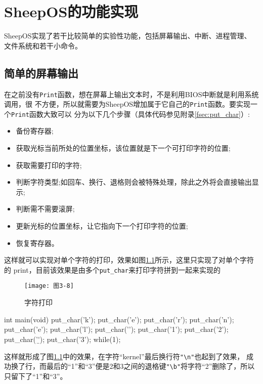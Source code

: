 \chapter{SheepOS的功能实现}

SheepOS实现了若干比较简单的实验性功能，包括屏幕输出、中断、进程管理、
文件系统和若干小命令。

\section{简单的屏幕输出}

在之前没有\texttt{Print}函数，想在屏幕上输出文本时，不是利用BIOS中断就是利用系统调用，很
不方便，所以就需要为SheepOS增加属于它自己的\texttt{Print}函数。要实现一个\texttt{Print}函数大致可以
分为以下几个步骤（具体代码参见附录\ref{fsec:put_char}）:

\begin{itemize}
\item 备份寄存器;
\item 获取光标当前所处的位置坐标，该位置就是下一个可打印字符的位置;
\item 获取需要打印的字符;
\item 判断字符类型;如回车、换行、退格则会被特殊处理，除此之外将会直接输出显示;
\item 判断需不需要滚屏;
\item 更新光标的位置坐标，让它指向下一个打印字符的位置;
\item 恢复寄存器。
\end{itemize}
这样就可以实现对单个字符的打印，效果如图\ref{fig:print_char}所示，这里只实现了对单个字符的
print，目前该效果是由多个\texttt{put\_char}来打印字符拼到一起来实现的

\begin{figure}[H]
  \centering
  \texttt{[image: 图3-8]}
  \caption{字符打印}
  \label{fig:print_char}
\end{figure}

\begin{codeblock}
\begin{ccode}
int main(void)
{
    put_char('k');
    put_char('e');
    put_char('r');
    put_char('n');
    put_char('e');
    put_char('l');
    put_char('\n');
    put_char('1');
    put_char('2');
    put_char('\b');
    put_char('3');
    while(1);
}
\end{ccode}
\end{codeblock}

这样就形成了图\ref{fig:print_char}中的效果，在字符“kernel”最后换行符\verb|"\n"|也起到了效果，
成功换了行，而最后的“1”和“3”便是2和3之间的退格键\verb|"\b"|将字符“2”删除了，所以只留下了“1”和“3”。

